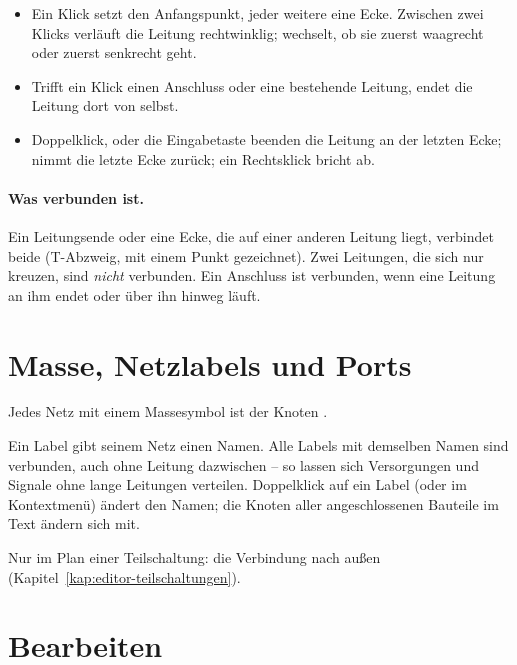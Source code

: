 \begin{itemize}
  \item Ein Klick setzt den Anfangspunkt, jeder weitere eine Ecke. Zwischen
    zwei Klicks verläuft die Leitung rechtwinklig; \taste{/} wechselt, ob
    sie zuerst waagrecht oder zuerst senkrecht geht.
  \item Trifft ein Klick einen Anschluss oder eine bestehende Leitung, endet
    die Leitung dort von selbst.
  \item Doppelklick,  oder die Eingabetaste beenden die Leitung
    an der letzten Ecke;  nimmt die letzte Ecke zurück; ein
    Rechtsklick bricht ab.
\end{itemize}

\paragraph{Was verbunden ist.}
Ein Leitungsende oder eine Ecke, die auf einer anderen Leitung liegt,
verbindet beide (T-Abzweig, mit einem Punkt gezeichnet). Zwei Leitungen, die
sich nur kreuzen, sind \emph{nicht} verbunden. Ein Anschluss ist verbunden,
wenn eine Leitung an ihm endet oder über ihn hinweg läuft.

\section{Masse, Netzlabels und Ports}

\begin{description}[style=nextline,leftmargin=2em]
  \item[Masse (\taste{G})]
    Jedes Netz mit einem Massesymbol ist der Knoten .
  \item[Netzlabel (\taste{N})]
    Ein Label gibt seinem Netz einen Namen. Alle Labels mit demselben Namen
    sind verbunden, auch ohne Leitung dazwischen – so lassen sich
    Versorgungen und Signale ohne lange Leitungen verteilen. Doppelklick
    auf ein Label (oder  im Kontextmenü) ändert den
    Namen; die Knoten aller angeschlossenen Bauteile im Text ändern sich mit.
  \item[Port (\taste{P})]
    Nur im Plan einer Teilschaltung: die Verbindung nach außen
    (Kapitel~\ref{kap:editor-teilschaltungen}).
\end{description}

\section{Bearbeiten}

